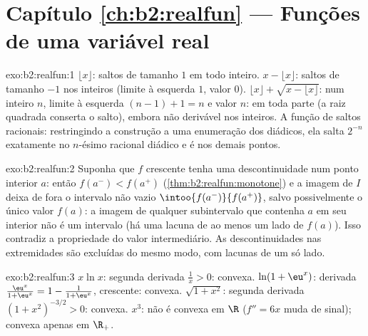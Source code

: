 \section*{Capítulo \ref{ch:b2:realfun} --- Funções de uma variável real}

\begin{solution}{exo:b2:realfun:1}
$\lfloor x\rfloor$: saltos de tamanho $1$ em todo inteiro. $x -
\lfloor x\rfloor$: saltos de tamanho $-1$ nos inteiros (limite à esquerda $1$,
valor $0$). $\lfloor x\rfloor + \sqrt{x - \lfloor x\rfloor}$: num
inteiro $n$, limite à esquerda $(n - 1) + 1 = n$ e valor $n$:
\emph{} em toda parte (a raiz quadrada conserta o salto),
embora não derivável nos inteiros. A função de saltos racionais:
restringindo a construção a uma enumeração dos diádicos, ela
salta $2^{-n}$ exatamente no $n$-ésimo racional diádico e é
 nos demais pontos.
\end{solution}

\begin{solution}{exo:b2:realfun:2}
Suponha que $f$ crescente tenha uma descontinuidade num ponto interior $a$: então
$f(a^-) < f(a^+)$ (\cref{thm:b2:realfun:monotone}) e a imagem
de $I$ deixa de fora o intervalo  não vazio
$\intoo{f(a^-)}{f(a^+)}$, salvo possivelmente o único valor $f(a)$:
a imagem de qualquer subintervalo que contenha $a$ em seu interior não é
um intervalo (há uma lacuna de ao menos um lado de $f(a)$). Isso
contradiz a propriedade do valor intermediário. As descontinuidades nas
extremidades são excluídas do mesmo modo, com lacunas de um só lado.
\end{solution}

\begin{solution}{exo:b2:realfun:3}
$x\ln x$: segunda derivada $\frac1x > 0$: convexa. $\ln(1 +
\eu^x)$: derivada $\frac{\eu^x}{1 + \eu^x} = 1 - \frac{1}{1 +
\eu^x}$, crescente: convexa. $\sqrt{1 + x^2}$: segunda derivada
$(1 + x^2)^{-3/2} > 0$: convexa. $x^3$: não é convexa em $\R$ ($f'' =
6x$ muda de sinal); convexa apenas em $\R_+$.
\end{solution}

